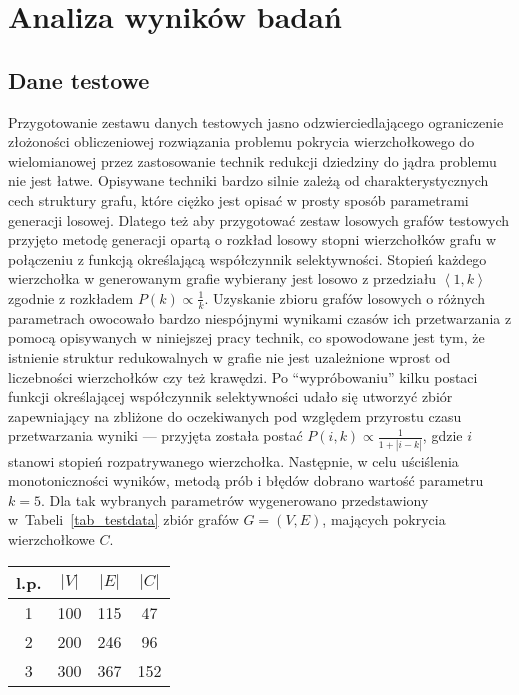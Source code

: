 \chapter{Analiza wyników badań}
\label{results}
\section{Dane testowe}
\par{
  Przygotowanie zestawu danych testowych jasno odzwierciedlającego ograniczenie złożoności obliczeniowej rozwiązania problemu pokrycia wierzchołkowego do wielomianowej przez zastosowanie technik redukcji dziedziny do jądra problemu nie jest łatwe.
  Opisywane techniki bardzo silnie zależą od charakterystycznych cech struktury grafu, które ciężko jest opisać w prosty sposób parametrami generacji losowej.
  Dlatego też aby przygotować zestaw losowych grafów testowych przyjęto metodę generacji opartą o rozkład losowy stopni wierzchołków grafu w połączeniu z funkcją określającą współczynnik selektywności.
  Stopień każdego wierzchołka w generowanym grafie wybierany jest losowo z przedziału $\left<1, k\right>$ zgodnie z rozkładem $P(k) \propto \frac{1}{k}$.
  Uzyskanie zbioru grafów losowych o różnych parametrach owocowało bardzo niespójnymi wynikami czasów ich przetwarzania z pomocą opisywanych w niniejszej pracy technik, co spowodowane jest tym, że istnienie struktur redukowalnych w grafie nie jest uzależnione wprost od liczebności wierzchołków czy też krawędzi.
  Po ``wypróbowaniu'' kilku postaci funkcji określającej współczynnik selektywności udało się utworzyć zbiór zapewniający na zbliżone do oczekiwanych pod względem przyrostu czasu przetwarzania wyniki --- przyjęta została postać $P(i, k) \propto \frac{1}{1+|i-k|}$, gdzie $i$ stanowi stopień rozpatrywanego wierzchołka.
  Następnie, w celu uściślenia monotoniczności wyników, metodą prób i błędów dobrano wartość parametru $k=5$.
  Dla tak wybranych parametrów wygenerowano przedstawiony w~Tabeli~\ref{tab_testdata} zbiór grafów $G=(V, E)$, mających pokrycia wierzchołkowe $C$.\\
  \begin{table}
    \begin{center}
    \begin{tabular}{| c | c | c | c |}
      \hline
      l.p. & $|V|$ & $|E|$ & $|C|$ \\ \hline
      1 & 100 & 115 & 47 \\
      2 & 200 & 246 & 96 \\
      3 & 300 & 367 & 152 \\

\end{tabular}
\end{center}
\end{table}}
